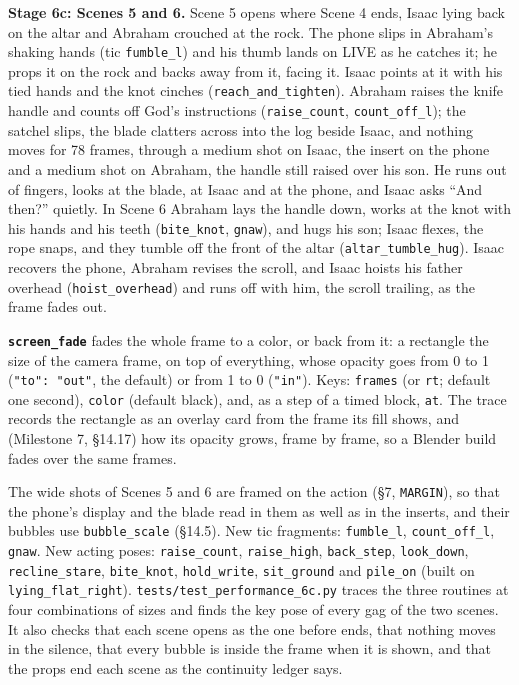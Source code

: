 \documentclass[
  12pt,
  letterpaper,
]{book}
\begin{document}
\textbf{Stage 6c: Scenes 5 and 6.} Scene 5 opens where Scene 4 ends,
Isaac lying back on the altar and Abraham crouched at the rock. The
phone slips in Abraham's shaking hands (tic \texttt{fumble\_l}) and his
thumb lands on LIVE as he catches it; he props it on the rock and backs
away from it, facing it. Isaac points at it with his tied hands and the
knot cinches (\texttt{reach\_and\_tighten}). Abraham raises the knife
handle and counts off God's instructions (\texttt{raise\_count},
\texttt{count\_off\_l}); the satchel slips, the blade clatters across
into the log beside Isaac, and nothing moves for 78 frames, through a
medium shot on Isaac, the insert on the phone and a medium shot on
Abraham, the handle still raised over his son. He runs out of fingers,
looks at the blade, at Isaac and at the phone, and Isaac asks ``And
then?'' quietly. In Scene 6 Abraham lays the handle down, works at the
knot with his hands and his teeth (\texttt{bite\_knot},
\texttt{gnaw}), and hugs his son; Isaac flexes, the rope snaps, and they
tumble off the front of the altar (\texttt{altar\_tumble\_hug}).
Isaac recovers the phone, Abraham revises the scroll, and Isaac hoists
his father overhead (\texttt{hoist\_overhead}) and runs off with him,
the scroll trailing, as the frame fades out.

\textbf{\texttt{screen\_fade}}
fades the whole frame to a color, or back from it: a rectangle the size
of the camera frame, on top of everything, whose opacity goes from 0 to
1 (\texttt{"to": "out"}, the default) or from 1 to 0 (\texttt{"in"}).
Keys: \texttt{frames} (or \texttt{rt}; default one second),
\texttt{color} (default black), and, as a step of a timed block,
\texttt{at}. The trace records the rectangle as an overlay card from
the frame its fill shows, and (Milestone 7, \S14.17) how its opacity
grows, frame by frame, so a Blender build fades over the same frames.

The wide shots of Scenes 5 and 6 are framed on the action (\S7,
\texttt{MARGIN}), so that the phone's display and the blade read in
them as well as in the inserts, and their bubbles use
\texttt{bubble\_scale} (\S14.5). New tic fragments: \texttt{fumble\_l},
\texttt{count\_off\_l}, \texttt{gnaw}. New acting poses:
\texttt{raise\_count}, \texttt{raise\_high}, \texttt{back\_step},
\texttt{look\_down}, \texttt{recline\_stare}, \texttt{bite\_knot},
\texttt{hold\_write}, \texttt{sit\_ground} and \texttt{pile\_on} (built
on \texttt{lying\_flat\_right}). \texttt{tests/test\_performance\_6c.py}
traces the three routines at four combinations of sizes and finds the
key pose of every gag of the two scenes. It also checks that each scene
opens as the one before ends, that nothing moves in the silence, that
every bubble is inside the frame when it is shown, and that the props
end each scene as the continuity ledger says.
\end{document}
